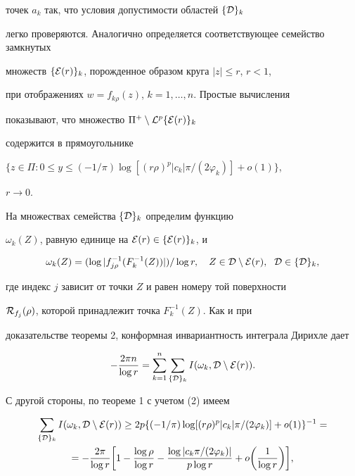 \begin{pf}
точек $a_k$ так, что условия допустимости областей $\{{\cal D}\}_k$


легко проверяются. Аналогично определяется соответствующее семейство замкнутых


множеств $\{{\cal E}(r)\}_k$, порожденное образом круга $|z|\leq r$, $r<1$,


при отображениях $w=f_{k\rho}(z)$, $k=1,\dotsc,n.$ Простые вычисления


показывают, что множество $\Pi^+\setminus{\cal L}^p\{{\cal E}(r)\}_k$


содержится в прямоугольнике


$\{z\in\Pi: 0\leq y\leq(-1/\pi)\log[(r\rho)^p|c_k|\pi/(2\varphi_k)]+o(1)\}$,


$r\to 0.$


На множествах семейства $\{{\cal D}\}_k$ определим функцию


$\omega_k(Z)$, равную единице на ${\cal E}(r)\in\{{\cal E}(r)\}_k$, и


$$


\omega_k(Z)=(\log |f_{j\rho}^{-1}(F_k^{-1}(Z))|)/\log r,\quad


Z\in{\cal D}\setminus{\cal E}(r),\ \; {\cal D}\in\{{\cal D}\}_k,


$$


где индекс $j$ зависит от точки $Z$ и равен номеру той поверхности


${\cal R}_{f_j}(\rho)$, которой принадлежит точка $F_k^{-1}(Z)$. Как и при


доказательстве теоремы 2, конформная инвариантность интеграла Дирихле дает


$$


-\frac{2\pi n}{\log r}=\sum\limits_{k=1}^{n}\sum\limits_{\{{\cal


D}\}_k}I(\omega_k,{\cal D}\setminus{\cal E}(r)).


$$


С другой стороны, по теореме 1 с учетом (2) имеем


\begin{multline*}


\sum\limits_{\{{\cal D}\}_k}I(\omega_k,{\cal D}\setminus{\cal E}(r))\geq


2p\{(-1/\pi)\log [(r\rho)^p|c_k|\pi/(2\varphi_k)]+o(1)\}^{-1}= \\


%


=-\frac{2\pi}{\log r}\bigg[1-\frac{\log \rho}{\log r}-\frac{\log


|c_k\pi/(2\varphi_k)|}{p\log r}+o\bigg(\frac{1}{\log r}\bigg)\bigg],



\end{multline*}
\end{pf}
